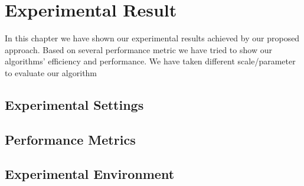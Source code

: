\documentclass[a4paper,12pt]{book}
\begin{document}
\chapter{Experimental Result}
In this chapter we have shown our experimental results achieved by our proposed approach. Based on several performance metric we have tried to show our algorithms' efficiency and performance. We have taken different scale/parameter to evaluate our algorithm
\section{Experimental Settings}

\section{Performance Metrics}

\section{Experimental Environment}

\end{document}
